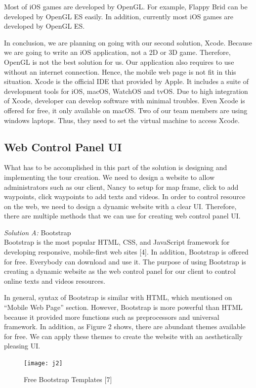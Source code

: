\documentclass[letterpaper, 10pt,titlepage]{article}
\begin{document}
Most of iOS games are developed by OpenGL. For example, Flappy Brid can be developed by OpenGL ES easily. In addition, currently most iOS games are developed by OpenGL ES.


In conclusion, we are planning on going with our second solution, Xcode. Because we are going to write an iOS application, not a 2D or 3D game. Therefore, OpenGL is not the best solution for us. Our application also requires to use without an internet connection. Hence, the mobile web page is not fit in this situation. Xcode is the official IDE that provided by Apple. It includes a suite of development tools for iOS, macOS, WatchOS and tvOS. Due to high integration of Xcode, developer can develop software with minimal troubles. Even Xcode is offered for free, it only available on macOS. Two of our team members are using windows laptops. Thus, they need to set the virtual machine to access Xcode.


\subsection{Web Control Panel UI}
What has to be accomplished in this part of the solution is designing and implementing the tour creation. We need to design a website to allow administrators such as our client, Nancy to setup for map frame, click to add waypoints, click waypoints to add texts and videos. In order to control resource on the web, we need to design a dynamic website with a clear UI. Therefore, there are multiple methods that we can use for creating web control panel UI.


\textit{Solution A:} Bootstrap\\
Bootstrap is the most popular HTML, CSS, and JavaScript framework for developing responsive, mobile-first web sites [4]. In addition, Bootstrap is offered for free. Everybody can download and use it. The purpose of using Bootstrap is creating a dynamic website as the web control panel for our client to control online texts and videos resources. 


In general, syntax of Bootstrap is similar with HTML, which mentioned on “Mobile Web Page” section. However, Bootstrap is more powerful than HTML because it provided more functions such as preprocessors and universal framework. In addition, as Figure 2 shows, there are abundant themes available for free. We can apply these themes to create the website with an aesthetically pleasing UI. 

\begin{figure}[ht]
    \centering
    \texttt{[image: j2]}
    \caption{Free Bootstrap Templates [7]}
    \label{jiawei2}
\end{figure}
\end{document}
